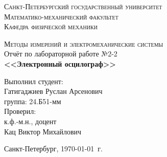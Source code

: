 \begin{titlepage}
\begin{center}
\textsc{Санкт-Петербургский государственный университет\\
Математико-механический факультет\\
Кафедра физической механики\\}

\vfill

\textsc{Методы измерений и электромеханические системы\\[3mm]}
Отчёт по лабораторной работе №2-2\\[6mm]


\textbf{\large<<Электронный осцилограф>>}

\vfill
\end{center}

\hfill
\begin{minipage}{.5\textwidth}
Выполнил студент:\\[2mm] 
Гатигаджиев Руслан Арсенович\\
группа: 24.Б51-мм\\[5mm]

Проверил:\\[2mm] 
к.ф.-м.н., доцент\\
Кац Виктор Михайлович
\end{minipage}%
\vfill
\begin{center}
 Санкт-Петербург, \yeardate\today\ г.
\end{center}
\end{titlepage}
